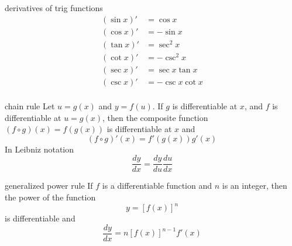 \documentclass[avery5371,grid]{flashcards}
\begin{document}
\begin{flashcard}[Theorem]{derivatives of trig functions}
\begin{align*}
(\sin x)' & = \cos x \\
(\cos x)' & = -\sin x \\
(\tan x)' & = \sec^2 x \\
(\cot x)' & = -\csc^2 x \\
(\sec x)' & = \sec x \tan x \\
(\csc x)' & = -\csc x \cot x \\
\end{align*}
\end{flashcard}

\begin{flashcard}[Theorem]{chain rule}
Let $u=g(x)$ and $y=f(u)$.  If $g$ is differentiable at $x$, and 
$f$ is differentiable at $u=g(x)$, then the composite function
$(f\circ g)(x) = f(g(x))$ is differentiable at $x$ and
\begin{equation*}
(f\circ g)'(x) = f'(g(x)) g'(x)
\end{equation*} 
In Leibniz notation
\begin{equation*}
\dfrac{dy}{dx}=\dfrac{dy}{du} \dfrac{du}{dx}
\end{equation*}
\end{flashcard}

\begin{flashcard}[Theorem]{generalized power rule}
If $f$ is a differentiable function and $n$ is an integer, then
the power of the function
\begin{equation*}
y = \left[ f(x) \right]^{n}
\end{equation*}
is differentiable and
\begin{equation*}
\dfrac{dy}{dx} = n\left[ f(x) \right]^{n-1}f'(x)
\end{equation*}
\end{flashcard}
\end{document}
